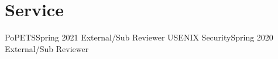 \section{Service}
  \CVSubHeadingListStart
    \CVSubheading
      {PoPETS}{Spring 2021}
      {External/Sub Reviewer}{}
    \CVSubheading
      {USENIX Security}{Spring 2020}
      {External/Sub Reviewer}{}
  \CVSubHeadingListEnd